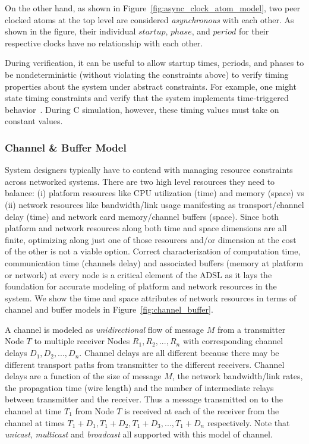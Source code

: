 On the other hand, as shown in Figure~\ref{fig:async_clock_atom_model}, two peer clocked atoms at the top level are considered \emph{asynchronous} with each other. As shown in the figure, their individual $startup$, $phase$, and $period$ for their respective clocks have no relationship with each other.

During verification, it can be useful to allow startup times, periods, and phases to be nondeterministic (without violating the constraints above) to verify timing properties about the system under abstract constraints. For example, one might state timing constraints and verify that the system implements time-triggered behavior~\cite{fmcad07}. During C simulation, however, these timing values must take on constant values.


\subsubsection{Channel \& Buffer Model}
\label{subsubsec:channel_buffer_model}


System designers typically have to contend with managing resource constraints across networked systems. There are two high level resources they need to balance: (i) platform resources like CPU utilization (time) and memory (space) vs (ii) network resources like bandwidth/link usage manifesting as transport/channel delay (time) and network card memory/channel buffers (space). Since both platform and network resources along both time and space dimensions are all finite, optimizing along just one of those resources and/or dimension at the cost of the other is not a viable option. Correct characterization of computation time, communication time (channels delay) and associated buffers (memory at platform or network) at every node is a critical element of the ADSL as it lays the foundation for accurate modeling of platform and network resources in the system.  We show the time and space attributes of network resources in terms of channel and buffer models in Figure~\ref{fig:channel_buffer}. 

A channel is modeled as \emph{unidirectional} flow of message $M$ from a transmitter Node $T$ to multiple receiver Nodes $R_1,R_2,...,R_n$ with corresponding channel delays $D_1,D_2,...,D_n$. Channel delays are all different because there may be different transport paths from transmitter to the different receivers. Channel delays are a function of the size of message $M$, the network bandwidth/link rates, the propagation time (wire length) and the number of intermediate relays between transmitter and the receiver. Thus a message transmitted on to the channel at time $T_1$ from Node $T$ is received at each of the receiver from the channel at times $T_1+D_1, T_1+D_2, T_1+D_3,...,T_1+D_n$ respectively. Note that \emph{unicast}, \emph{multicast} and \emph{broadcast} all supported with this model of channel.

